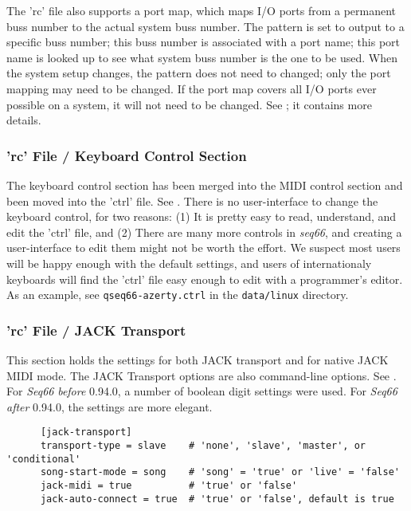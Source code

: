    The 'rc' file also supports a port map, which maps I/O ports from a
   permanent buss number to the actual system buss number.
   The pattern is set to output to a specific buss number; this buss number is
   associated with a port name; this port name is looked up to see what
   system buss number is the one to be used.  When the system setup changes,
   the pattern does not need to changed; only the port mapping may need to be
   changed.  If the port map covers all I/O ports ever possible on a system, it
   will not need to be changed.  See ; it contains
   more details.

\subsubsection{'rc' File / Keyboard Control Section}
\label{subsubsec:configuration_rc_keyboard_control}

   The keyboard control section has been merged into the MIDI control section
   and been moved into the 'ctrl' file.
   See .
   There is no user-interface to change the
   keyboard control, for two reasons:
   (1) It is pretty easy to read, understand, and edit the 'ctrl' file, and
   (2) There are many more controls in \textsl{seq66}, and creating a
   user-interface to edit them might not be worth the effort.
   We suspect most users will be happy enough with the default settings,
   and users of internationaly keyboards will find the 'ctrl' file easy enough
   to edit with a programmer's editor.  As an example,
   see \texttt{qseq66-azerty.ctrl} in the \texttt{data/linux}
   directory.
        
\subsubsection{'rc' File / JACK Transport}
\label{subsubsec:configuration_rc_jack_transport}

   This section holds the settings for both JACK transport and for native JACK
   MIDI mode.
   The JACK Transport options are also command-line options.
   See .
   For \textsl{Seq66} \textsl{before} 0.94.0, a number of boolean digit settings
   were used.
   For \textsl{Seq66} \textsl{after} 0.94.0, the settings are more elegant.

   \begin{verbatim}
      [jack-transport]
      transport-type = slave    # 'none', 'slave', 'master', or 'conditional'
      song-start-mode = song    # 'song' = 'true' or 'live' = 'false'
      jack-midi = true          # 'true' or 'false'
      jack-auto-connect = true  # 'true' or 'false', default is true
   \end{verbatim}

